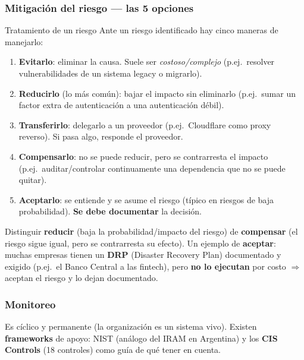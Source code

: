 \documentclass[../main.tex]{subfiles}
\begin{document}
\subsubsection{Mitigación del riesgo --- las 5 opciones}
\begin{definicion}{Tratamiento de un riesgo}
Ante un riesgo identificado hay cinco maneras de manejarlo:
\begin{enumerate}
  \item \textbf{Evitarlo}: eliminar la causa. Suele ser \emph{costoso/complejo}
    (p.ej.\ resolver vulnerabilidades de un sistema legacy o migrarlo).
  \item \textbf{Reducirlo} (lo más común): bajar el impacto sin eliminarlo
    (p.ej.\ sumar un factor extra de autenticación a una autenticación débil).
  \item \textbf{Transferirlo}: delegarlo a un proveedor (p.ej.\ Cloudflare como
    proxy reverso). Si pasa algo, responde el proveedor.
  \item \textbf{Compensarlo}: no se puede reducir, pero se contrarresta el
    impacto (p.ej.\ auditar/controlar continuamente una dependencia que no se
    puede quitar).
  \item \textbf{Aceptarlo}: se entiende y se asume el riesgo (típico en riesgos
    de baja probabilidad). \textbf{Se debe documentar} la decisión.
\end{enumerate}
\end{definicion}

\begin{examen}
Distinguir \textbf{reducir} (baja la probabilidad/impacto del riesgo) de
\textbf{compensar} (el riesgo sigue igual, pero se contrarresta su efecto). Un
ejemplo de \textbf{aceptar}: muchas empresas tienen un \textbf{DRP} (Disaster
Recovery Plan) documentado y exigido (p.ej.\ el Banco Central a las fintech),
pero \textbf{no lo ejecutan} por costo $\Rightarrow$ aceptan el riesgo y lo
dejan documentado.
\end{examen}

\subsubsection{Monitoreo}
Es cíclico y permanente (la organización es un sistema vivo). Existen
\textbf{frameworks} de apoyo: NIST (análogo del IRAM en Argentina) y los
\textbf{CIS Controls} (18 controles) como guía de qué tener en cuenta.

\end{document}
